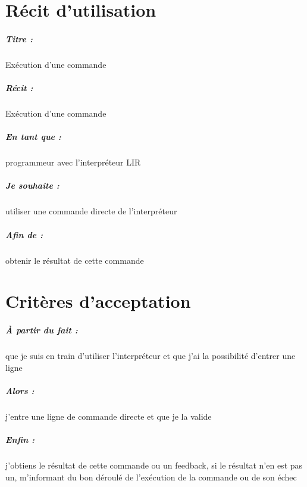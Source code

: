\documentclass[12pt,a5paper, notitle, oneside]{report}
\begin{document}
    \chapter*{Récit d'utilisation}

    \paragraph{Titre : } Exécution d'une commande %
    \paragraph{Récit : } Exécution d'une commande %
    \paragraph{En tant que : } programmeur avec l'interpréteur LIR %
    \paragraph{Je souhaite : } utiliser une commande directe de l'interpréteur %
    \paragraph{Afin de : } obtenir le résultat de cette commande %
    \newpage

    \chapter*{Critères d'acceptation}

    \paragraph{À partir du fait : } que je suis en train d'utiliser l'interpréteur et que j'ai la possibilité d'entrer une ligne %
    \paragraph{Alors : } j'entre une ligne de commande directe et que je la valide %
    \paragraph{Enfin : } j'obtiens le résultat de cette commande ou un feedback, 
    si le résultat n'en est pas un, m'informant du bon déroulé de 
    l'exécution de la commande ou de son échec %
\end{document}
